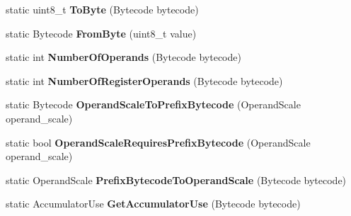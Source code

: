 \begin{DoxyCompactItemize}
\item 
static uint8\+\_\+t {\bfseries To\+Byte} (Bytecode bytecode)\hypertarget{classv8_1_1internal_1_1interpreter_1_1_bytecodes_a8fcd469fdbcc324b162ded31f78431a9}{}\label{classv8_1_1internal_1_1interpreter_1_1_bytecodes_a8fcd469fdbcc324b162ded31f78431a9}

\item 
static Bytecode {\bfseries From\+Byte} (uint8\+\_\+t value)\hypertarget{classv8_1_1internal_1_1interpreter_1_1_bytecodes_a001ff1445e18744bd3c3af34ff8b047c}{}\label{classv8_1_1internal_1_1interpreter_1_1_bytecodes_a001ff1445e18744bd3c3af34ff8b047c}

\item 
static int {\bfseries Number\+Of\+Operands} (Bytecode bytecode)\hypertarget{classv8_1_1internal_1_1interpreter_1_1_bytecodes_a4c0601833371b9a91bd098f28d38e62a}{}\label{classv8_1_1internal_1_1interpreter_1_1_bytecodes_a4c0601833371b9a91bd098f28d38e62a}

\item 
static int {\bfseries Number\+Of\+Register\+Operands} (Bytecode bytecode)\hypertarget{classv8_1_1internal_1_1interpreter_1_1_bytecodes_a7af84802b81297ba22f82a91a8ff8f3b}{}\label{classv8_1_1internal_1_1interpreter_1_1_bytecodes_a7af84802b81297ba22f82a91a8ff8f3b}

\item 
static Bytecode {\bfseries Operand\+Scale\+To\+Prefix\+Bytecode} (Operand\+Scale operand\+\_\+scale)\hypertarget{classv8_1_1internal_1_1interpreter_1_1_bytecodes_acbb664a95c37c0537eccb228580b0bd5}{}\label{classv8_1_1internal_1_1interpreter_1_1_bytecodes_acbb664a95c37c0537eccb228580b0bd5}

\item 
static bool {\bfseries Operand\+Scale\+Requires\+Prefix\+Bytecode} (Operand\+Scale operand\+\_\+scale)\hypertarget{classv8_1_1internal_1_1interpreter_1_1_bytecodes_a16c94e6bd7c03841b1c4f854e4f5c6af}{}\label{classv8_1_1internal_1_1interpreter_1_1_bytecodes_a16c94e6bd7c03841b1c4f854e4f5c6af}

\item 
static Operand\+Scale {\bfseries Prefix\+Bytecode\+To\+Operand\+Scale} (Bytecode bytecode)\hypertarget{classv8_1_1internal_1_1interpreter_1_1_bytecodes_a2d60b29d811710158b9a6b89607825a7}{}\label{classv8_1_1internal_1_1interpreter_1_1_bytecodes_a2d60b29d811710158b9a6b89607825a7}

\item 
static Accumulator\+Use {\bfseries Get\+Accumulator\+Use} (Bytecode bytecode)\hypertarget{classv8_1_1internal_1_1interpreter_1_1_bytecodes_aef0a88035ef4b5b09873a056e220d620}{}\label{classv8_1_1internal_1_1interpreter_1_1_bytecodes_aef0a88035ef4b5b09873a056e220d620}


\end{DoxyCompactItemize}

